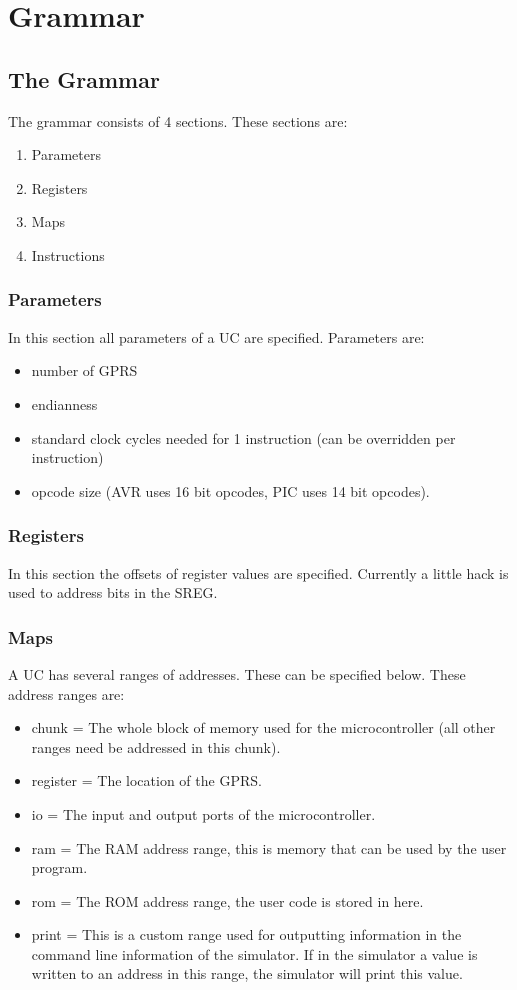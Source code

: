 \chapter{Grammar}

\section{The Grammar}
The grammar consists of 4 sections. These sections are:
\begin{enumerate}
\item Parameters
\item Registers
\item Maps
\item Instructions
\end{enumerate}

\subsection{Parameters}
In this section all parameters of a \ac{UC} are specified. Parameters are: 


\begin{itemize}
\item number of \ac{GPRS} 
\item endianness
\item standard clock cycles needed for 1 instruction (can be overridden per instruction)
\item opcode size (AVR uses 16 bit opcodes, PIC uses 14 bit opcodes).
\end{itemize} 

\subsection{Registers}
In this section the offsets of register values are specified. Currently a little hack is used to address bits in the \ac{SREG}.

\subsection{Maps}
A \ac{UC} has several ranges of addresses. These can be specified below. These address ranges are:
\begin{itemize}
\item chunk = The whole block of memory used for the microcontroller (all other ranges need be addressed in this chunk).
\item register = The location of the \ac{GPRS}.
\item io = The input and output ports of the microcontroller.
\item ram = The \ac{RAM} address range, this is memory that can be used by the user program.
\item rom = The \ac{ROM} address range, the user code is stored in here. 
\item print = This is a custom range used for outputting information in the command line information of the simulator. If in the simulator a value is written to an address in this range, the simulator will print this value.
\end{itemize}

